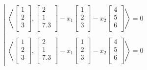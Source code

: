\begin{ejemplo}
$$
\left|
	\begin{array}{c}
		\left\langle
		\begin{bmatrix}
			1 \\
			2 \\
			3 \\
		\end{bmatrix}
		,
		\begin{bmatrix}
			2 \\
			1 \\
			7.3 \\
		\end{bmatrix}
		- x_1
		\begin{bmatrix}
			1 \\
			2 \\
			3 \\
		\end{bmatrix}
		- x_2
		\begin{bmatrix}
			4 \\
			5 \\
			6 \\
		\end{bmatrix}
		\right\rangle
		= 0 \\
		\\

		\left\langle
		\begin{bmatrix}
			1 \\
			2 \\
			3 \\
		\end{bmatrix}
		,
		\begin{bmatrix}
			2 \\
			1 \\
			7.3 \\
		\end{bmatrix}
		- x_1
		\begin{bmatrix}
			1 \\
			2 \\
			3 \\
		\end{bmatrix}
		- x_2
		\begin{bmatrix}
			4 \\
			5 \\
			6 \\
		\end{bmatrix}
		\right\rangle
		= 0
	\end{array}
\right.
$$


\end{ejemplo}
